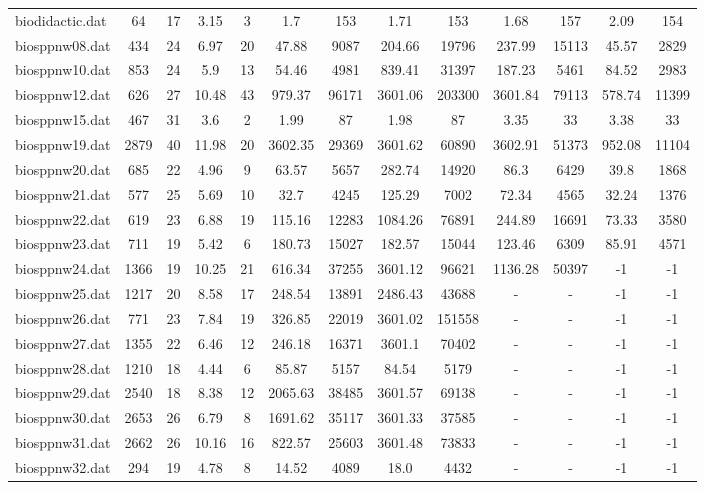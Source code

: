 \begin{table}[!ht]
{\begin{tabular}{lcccccccccccc}
biodidactic.dat & 64 & 17 & 3.15 & 3 & 1.7 & 153 & 1.71 & 153 & 1.68 & 157 & 2.09 & 154 \\
biosppnw08.dat & 434 & 24 & 6.97 & 20 & 47.88 & 9087 & 204.66 & 19796 & 237.99 & 15113 & 45.57 & 2829 \\
biosppnw10.dat & 853 & 24 & 5.9 & 13 & 54.46 & 4981 & 839.41 & 31397 & 187.23 & 5461 & 84.52 & 2983 \\
biosppnw12.dat & 626 & 27 & 10.48 & 43 & 979.37 & 96171 & 3601.06 & 203300 & 3601.84 & 79113 & 578.74 & 11399 \\
biosppnw15.dat & 467 & 31 & 3.6 & 2 & 1.99 & 87 & 1.98 & 87 & 3.35 & 33 & 3.38 & 33 \\
biosppnw19.dat & 2879 & 40 & 11.98 & 20 & 3602.35 & 29369 & 3601.62 & 60890 & 3602.91 & 51373 & 952.08 & 11104 \\
biosppnw20.dat & 685 & 22 & 4.96 & 9 & 63.57 & 5657 & 282.74 & 14920 & 86.3 & 6429 & 39.8 & 1868 \\
biosppnw21.dat & 577 & 25 & 5.69 & 10 & 32.7 & 4245 & 125.29 & 7002 & 72.34 & 4565 & 32.24 & 1376 \\
biosppnw22.dat & 619 & 23 & 6.88 & 19 & 115.16 & 12283 & 1084.26 & 76891 & 244.89 & 16691 & 73.33 & 3580 \\
biosppnw23.dat & 711 & 19 & 5.42 & 6 & 180.73 & 15027 & 182.57 & 15044 & 123.46 & 6309 & 85.91 & 4571 \\
biosppnw24.dat & 1366 & 19 & 10.25 & 21 & 616.34 & 37255 & 3601.12 & 96621 & 1136.28 & 50397 & -1 & -1 \\
biosppnw25.dat & 1217 & 20 & 8.58 & 17 & 248.54 & 13891 & 2486.43 & 43688 &  - &  - & -1 & -1 \\
biosppnw26.dat & 771 & 23 & 7.84 & 19 & 326.85 & 22019 & 3601.02 & 151558 &  - &  - & -1 & -1 \\
biosppnw27.dat & 1355 & 22 & 6.46 & 12 & 246.18 & 16371 & 3601.1 & 70402 &  - &  - & -1 & -1 \\
biosppnw28.dat & 1210 & 18 & 4.44 & 6 & 85.87 & 5157 & 84.54 & 5179 &  - &  - & -1 & -1 \\
biosppnw29.dat & 2540 & 18 & 8.38 & 12 & 2065.63 & 38485 & 3601.57 & 69138 &  - &  - & -1 & -1 \\
biosppnw30.dat & 2653 & 26 & 6.79 & 8 & 1691.62 & 35117 & 3601.33 & 37585 &  - &  - & -1 & -1 \\
biosppnw31.dat & 2662 & 26 & 10.16 & 16 & 822.57 & 25603 & 3601.48 & 73833 &  - &  - & -1 & -1 \\
biosppnw32.dat & 294 & 19 & 4.78 & 8 & 14.52 & 4089 & 18.0 & 4432 &  - &  - & -1 & -1 \\

\end{tabular}}
\end{table}

